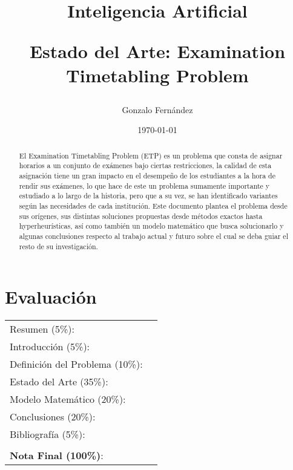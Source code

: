 \documentclass[letter, 10pt]{article}
\begin{document}
\title{Inteligencia Artificial \\ \begin{Large}Estado del Arte: Examination Timetabling Problem\end{Large}}
\author{Gonzalo Fernández}
\date{\today}
\maketitle


\section*{Evaluación}

\begin{tabular}{ll}
Resumen (5\%): & \underline{\hspace{2cm}} \\
Introducción (5\%):  & \underline{\hspace{2cm}} \\
Definición del Problema (10\%):  & \underline{\hspace{2cm}} \\
Estado del Arte (35\%):  & \underline{\hspace{2cm}} \\
Modelo Matemático (20\%): &  \underline{\hspace{2cm}}\\
Conclusiones (20\%): &  \underline{\hspace{2cm}}\\
Bibliografía (5\%): & \underline{\hspace{2cm}}\\
 &  \\
\textbf{Nota Final (100\%)}:   & \underline{\hspace{2cm}}
\end{tabular}
\vspace{2cm}


\begin{abstract}
El Examination Timetabling Problem (ETP) es un problema que consta de asignar horarios a un conjunto de exámenes bajo ciertas restricciones, la calidad de esta asignación tiene un gran impacto en el desempeño de los estudiantes a la hora de rendir sus exámenes, lo que hace de este un problema sumamente importante y estudiado a lo largo de la historia, pero que a su vez, se han identificado variantes según las necesidades de cada institución. Este documento plantea el problema desde sus orígenes, sus distintas soluciones propuestas desde métodos exactos hasta hyperheurísticas, así como también un modelo matemático que busca solucionarlo y algunas conclusiones respecto al trabajo actual y futuro sobre el cual se deba guiar el resto de su investigación.
\end{abstract}
\end{document}
